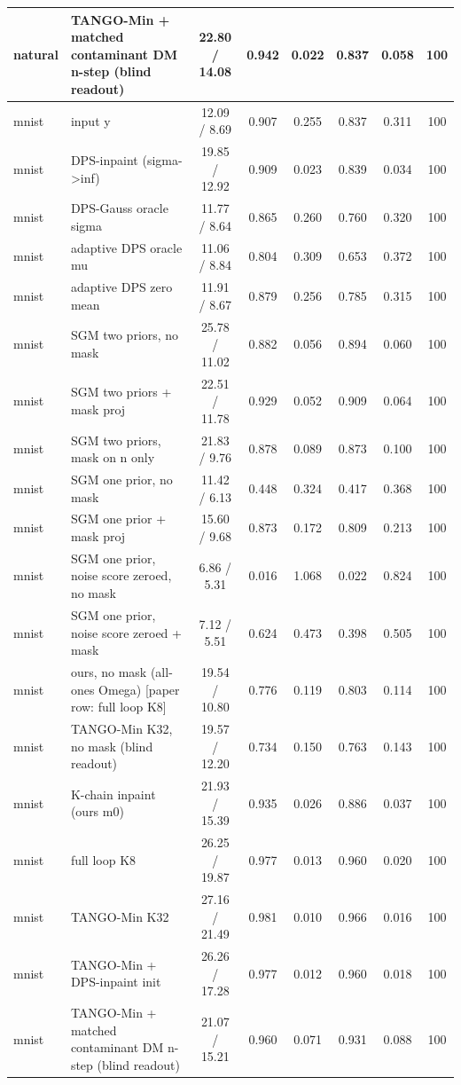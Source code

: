 \begin{tabular}{llcccccc}
natural & TANGO-Min + matched contaminant DM n-step (blind readout) & 22.80 / 14.08 & 0.942 & 0.022 & 0.837 & 0.058 & 100\\
\midrule
mnist & input y & 12.09 / 8.69 & 0.907 & 0.255 & 0.837 & 0.311 & 100\\
mnist & DPS-inpaint (sigma->inf) & 19.85 / 12.92 & 0.909 & 0.023 & 0.839 & 0.034 & 100\\
mnist & DPS-Gauss oracle sigma & 11.77 / 8.64 & 0.865 & 0.260 & 0.760 & 0.320 & 100\\
mnist & adaptive DPS oracle mu & 11.06 / 8.84 & 0.804 & 0.309 & 0.653 & 0.372 & 100\\
mnist & adaptive DPS zero mean & 11.91 / 8.67 & 0.879 & 0.256 & 0.785 & 0.315 & 100\\
mnist & SGM two priors, no mask & 25.78 / 11.02 & 0.882 & 0.056 & 0.894 & 0.060 & 100\\
mnist & SGM two priors + mask proj & 22.51 / 11.78 & 0.929 & 0.052 & 0.909 & 0.064 & 100\\
mnist & SGM two priors, mask on n only & 21.83 / 9.76 & 0.878 & 0.089 & 0.873 & 0.100 & 100\\
mnist & SGM one prior, no mask & 11.42 / 6.13 & 0.448 & 0.324 & 0.417 & 0.368 & 100\\
mnist & SGM one prior + mask proj & 15.60 / 9.68 & 0.873 & 0.172 & 0.809 & 0.213 & 100\\
mnist & SGM one prior, noise score zeroed, no mask & 6.86 / 5.31 & 0.016 & 1.068 & 0.022 & 0.824 & 100\\
mnist & SGM one prior, noise score zeroed + mask & 7.12 / 5.51 & 0.624 & 0.473 & 0.398 & 0.505 & 100\\
mnist & ours, no mask (all-ones Omega) [paper row: full loop K8] & 19.54 / 10.80 & 0.776 & 0.119 & 0.803 & 0.114 & 100\\
mnist & TANGO-Min K32, no mask (blind readout) & 19.57 / 12.20 & 0.734 & 0.150 & 0.763 & 0.143 & 100\\
mnist & K-chain inpaint (ours m0) & 21.93 / 15.39 & 0.935 & 0.026 & 0.886 & 0.037 & 100\\
mnist & full loop K8 & 26.25 / 19.87 & 0.977 & 0.013 & 0.960 & 0.020 & 100\\
mnist & TANGO-Min K32 & 27.16 / 21.49 & 0.981 & 0.010 & 0.966 & 0.016 & 100\\
mnist & TANGO-Min + DPS-inpaint init & 26.26 / 17.28 & 0.977 & 0.012 & 0.960 & 0.018 & 100\\
mnist & TANGO-Min + matched contaminant DM n-step (blind readout) & 21.07 / 15.21 & 0.960 & 0.071 & 0.931 & 0.088 & 100\\

\end{tabular}
